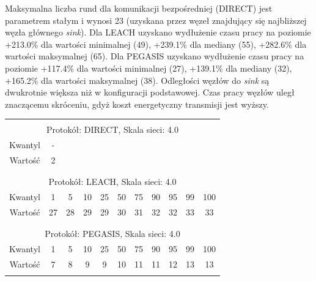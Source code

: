 \documentclass[a4paper,12pt,twoside,openany]{report}
\begin{document}
\par
Maksymalna liczba rund dla komunikacji bezpośredniej (DIRECT) jest parametrem stałym i wynosi 23 (uzyskana przez węzeł znajdujący się najbliższej węzła głównego \textit{sink}).
Dla LEACH uzyskano wydłużenie czasu pracy na poziomie +213.0\% dla wartości minimalnej (49), +239.1\% dla mediany (55), +282.6\% dla wartości maksymalnej (65).
Dla PEGASIS uzyskano wydłużenie czasu pracy na poziomie +117.4\% dla wartości minimalnej (27), +139.1\% dla mediany (32), +165.2\% dla wartości maksymalnej (38).
Odległości węzłów do \textit{sink} są dwukrotnie większa niż w konfiguracji podstawowej. Czas pracy węzłów uległ znaczącemu skróceniu, gdyż koszt energetyczny transmisji jest wyższy.

\begin{longtable}{*{11}{c}}
\toprule \\*
\multicolumn{11}{c}{Protokół: DIRECT, Skala sieci: 4.0} \\*
Kwantyl	& -	\\*
Wartość	& 2	\\*
\midrule \\*
\\*
\multicolumn{11}{c}{Protokół: LEACH, Skala sieci: 4.0} \\*
Kwantyl	& 1	& 5	& 10	& 25	& 50	& 75	& 90	& 95	& 99	& 100	\\*
Wartość	& 27	& 28	& 29	& 29	& 30	& 31	& 32	& 32	& 33	& 33	\\*
\midrule \\*
\\*
\multicolumn{11}{c}{Protokół: PEGASIS, Skala sieci: 4.0} \\*
Kwantyl	& 1	& 5	& 10	& 25	& 50	& 75	& 90	& 95	& 99	& 100	\\*
Wartość	& 7	& 8	& 9	& 9	& 10	& 11	& 11	& 12	& 13	& 13	\\*	
\bottomrule \\*
\end{longtable}
\end{document}

